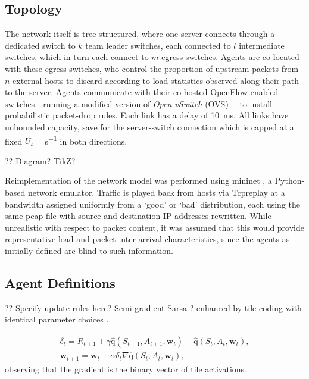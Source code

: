 \documentclass[conference, letterpaper, 10pt, times]{IEEEtran}
\newcommand{\acval}[3]{\ensuremath{\operatorname{\hat{q}}(#1, #2, #3)}}
\newcommand{\wvec}[1]{\ensuremath{\bm{w}_{#1}}}
\begin{document}
\subsection{Topology}
The network itself is tree-structured, where one server connects through a dedicated switch to $k$ team leader switches, each connected to $l$ intermediate switches, which in turn each connect to $m$ egress switches.
Agents are co-located with these egress switches, who control the proportion of upstream packets from $n$ external hosts to discard according to load statistics observed along their path to the server.
Agents communicate with their co-hosted OpenFlow-enabled switches---running a modified version of \emph{Open vSwitch} (OVS) \cite{open-vswitch}---to install probabilistic packet-drop rules.
Each link has a delay of \SI{10}{\milli\second}.
All links have unbounded capacity, save for the server-switch connection which is capped at a fixed $U_s$ \si{\mega\bit\per\second} in both directions.

?? Diagram? TikZ?

Reimplementation of the network model was performed using mininet \cite{mininet}, a Python-based network emulator.
Traffic is played back from hosts via Tcpreplay at a bandwidth assigned uniformly from a `good' or `bad' distribution, each using the same pcap file with source and destination IP addresses rewritten.
While unrealistic with respect to packet content, it was assumed that this would provide representative load and packet inter-arrival characteristics, since the agents as initially defined are blind to such information.

\subsection{Agent Definitions}

?? Specify update rules here? Semi-gradient Sarsa \cite[pp.\ \numrange{243}{244}]{RL2E}? enhanced by tile-coding with identical parameter choices \cite{DBLP:phd/ethos/Malialis14}.

\begin{subequations}
\begin{align}
\delta_t = R_{t+1} + \gamma \acval{S_{t+1}}{A_{t+1}}{\wvec{t}} - \acval{S_t}{A_t}{\wvec{t}},\\
\bm{w}_{t+1} = \bm{w}_{t} + \alpha \delta_t \nabla{\acval{S_t}{A_t}{\wvec{t}}},
\end{align}
\end{subequations}
observing that the gradient is the binary vector of tile activations.
\end{document}
